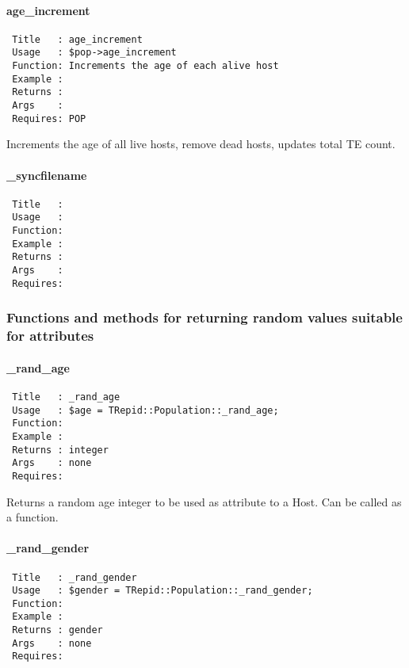 \paragraph*{age\_increment\label{age_increment}}
\begin{verbatim}
 Title   : age_increment
 Usage   : $pop->age_increment
 Function: Increments the age of each alive host
 Example :
 Returns :
 Args    :
 Requires: POP
\end{verbatim}


Increments the age of all live hosts, remove dead hosts, updates total
TE count.

\paragraph*{\_syncfilename\label{_syncfilename}}
\begin{verbatim}
 Title   : 
 Usage   : 
 Function: 
 Example : 
 Returns : 
 Args    : 
 Requires:
\end{verbatim}
\subsubsection*{Functions and methods for returning random values suitable for
attributes\label{Functions_and_methods_for_returning_random_values_suitable_for_attributes}}
\paragraph*{\_rand\_age\label{_rand_age}}
\begin{verbatim}
 Title   : _rand_age
 Usage   : $age = TRepid::Population::_rand_age;
 Function: 
 Example : 
 Returns : integer
 Args    : none
 Requires:
\end{verbatim}


Returns a random age integer to be used as attribute to a Host. Can
be called as a function.

\paragraph*{\_rand\_gender\label{_rand_gender}}
\begin{verbatim}
 Title   : _rand_gender
 Usage   : $gender = TRepid::Population::_rand_gender;
 Function: 
 Example : 
 Returns : gender
 Args    : none
 Requires:
\end{verbatim}


